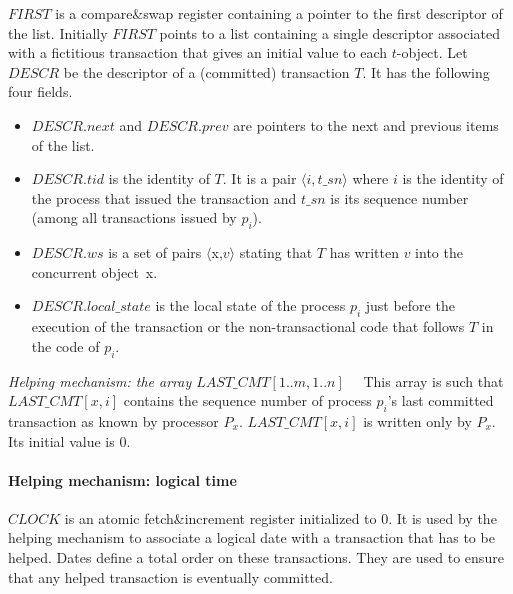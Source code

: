 $\mathit{FIRST}$ is a compare\&swap register containing  a pointer to the
first descriptor of the list. Initially $\mathit{FIRST}$ points to a  list 
containing a single descriptor associated with a fictitious transaction that
gives an  initial value to  each $t$-object. 
Let $\mathit{DESCR}$ be the descriptor of a (committed) transaction
$T$. It has  the following four fields.
\begin{itemize}
\item 
$\mathit{DESCR}.next$ and $\mathit{DESCR}.prev$ are pointers to the next 
and previous items of the list.
%
\item 
$\mathit{DESCR}.tid$ is the identity of $T$. It is a pair 
$\langle i,t\_sn \rangle $ where $i$ is the identity of the process 
that issued the transaction and  $t\_sn$ is its sequence number (among all
transactions issued by $p_i$). 
%
\item 
$\mathit{DESCR}.ws$ is a set of pairs $\langle${\sc x},$v \rangle$ 
stating that $T$  has written $v$ into the concurrent  object~{\sc x}. 
%
\item $\mathit{DESCR}.local\_state$ is the local state of the process $p_i$ 
just before the  execution of  the transaction or the non-transactional code that follows $T$ in the code of $p_i$.
\end{itemize}



\noindent
{\it Helping mechanism: the array $\mathit{LAST\_CMT}[1..m,1..n]$}~~
This array  is  such that $\mathit{LAST\_CMT}[x,i]$ contains the sequence   
number of process $p_i$'s  last committed transaction as known by processor
$P_x$.  
$\mathit{LAST\_CMT}[x,i]$ is  written only  by  $P_x$. Its initial  value is
$0$.    


\paragraph{Helping mechanism: logical time}
$\mathit{CLOCK}$ is an atomic fetch\&increment register initialized 
to $0$.  It is used by the  helping mechanism to associate a logical date
with a  transaction that has to be  helped. Dates define a total  order 
on these transactions. They are used to ensure 
that any helped  transaction is  eventually  committed. 



